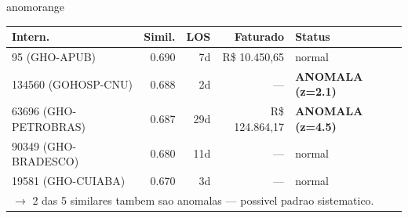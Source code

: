 \documentclass[a4paper,10pt]{article}
\begin{document}
\begin{anomalycard}[Internacao 112188 | GHO-BRADESCO | ALTO (z=4.05)]{anomorange}
\begin{tabular}{l r r r l}\toprule\textbf{Intern.} & \textbf{Simil.} & \textbf{LOS} & \textbf{Faturado} & \textbf{Status} \\\midrule
95 (GHO-APUB) & 0.690 & 7d & R\$ 10.450,65 & \textcolor{jcubeblue}{normal} \\
134560 (GOHOSP-CNU) & 0.688 & 2d & --- & \textcolor{anomred}{\textbf{ANOMALA (z=2.1)}} \\
63696 (GHO-PETROBRAS) & 0.687 & 29d & R\$ 124.864,17 & \textcolor{anomred}{\textbf{ANOMALA (z=4.5)}} \\
90349 (GHO-BRADESCO) & 0.680 & 11d & --- & \textcolor{jcubeblue}{normal} \\
19581 (GHO-CUIABA) & 0.670 & 3d & --- & \textcolor{jcubeblue}{normal} \\
\multicolumn{5}{l}{\textcolor{anomred}{\small $\rightarrow$ 2 das 5 similares tambem sao anomalas --- possivel padrao sistematico.}} \\
\bottomrule\end{tabular}


\end{anomalycard}

\newpage
\end{document}
